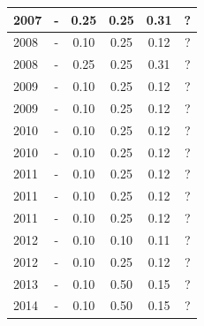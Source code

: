 \begin{table}[H]
\begin{tabular}{| l | c | c | c | c | c |}
            2007
          &
          -
          &
          0.25
          &
          0.25
          &
            {\color{red} 0.31}
          &
          ?
          \\
\hline
            2008
          &
          -
          &
          0.10
          &
          0.25
          &
            {\color{red} 0.12}
          &
          ?
          \\
            2008
          &
          -
          &
          0.25
          &
          0.25
          &
            {\color{red} 0.31}
          &
          ?
          \\
\hline
            2009
          &
          -
          &
          0.10
          &
          0.25
          &
            {\color{red} 0.12}
          &
          ?
          \\
            2009
          &
          -
          &
          0.10
          &
          0.25
          &
            {\color{red} 0.12}
          &
          ?
          \\
\hline
            2010
          &
          -
          &
          0.10
          &
          0.25
          &
            {\color{red} 0.12}
          &
          ?
          \\
            2010
          &
          -
          &
          0.10
          &
          0.25
          &
            {\color{red} 0.12}
          &
          ?
          \\
\hline
            2011
          &
          -
          &
          0.10
          &
          0.25
          &
            {\color{red} 0.12}
          &
          ?
          \\
            2011
          &
          -
          &
          0.10
          &
          0.25
          &
            {\color{red} 0.12}
          &
          ?
          \\
            2011
          &
          -
          &
          0.10
          &
          0.25
          &
            {\color{red} 0.12}
          &
          ?
          \\
\hline
            2012
          &
          -
          &
          0.10
          &
          0.10
          &
            {\color{red} 0.11}
          &
          ?
          \\
            2012
          &
          -
          &
          0.10
          &
          0.25
          &
            {\color{red} 0.12}
          &
          ?
          \\
\hline
            2013
          &
          -
          &
          0.10
          &
          0.50
          &
            {\color{red} 0.15}
          &
          ?
          \\
\hline
            2014
          &
          -
          &
          0.10
          &
          0.50
          &
            {\color{red} 0.15}
          &
          ?
          \\
\hline
\end{tabular}
\end{table}



